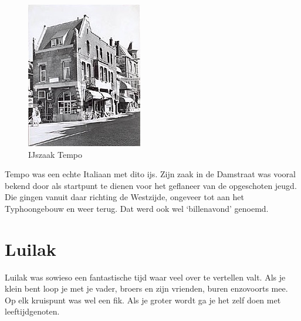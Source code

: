 \documentclass[12pt,twoside, openright]{memoir}
\begin{document}
\begin{figure}
\includegraphics[width=\textwidth]{img/ch8/Tempo}
\caption*{\footnotesize IJszaak Tempo}
\end{figure}

Tempo was een echte Italiaan met dito ijs. Zijn zaak in de Damstraat was vooral bekend door als startpunt te dienen voor het geflaneer van de opgeschoten jeugd.  Die gingen vanuit daar richting de Westzijde, ongeveer tot aan het Typhoongebouw en weer terug. Dat werd ook wel ‘billenavond’ genoemd. 

\chapter{Luilak} %
\label{cha:luilak}

Luilak was sowieso een fantastische tijd waar veel over te vertellen valt. Als je klein bent loop je met je vader, broers en zijn vrienden, buren enzovoorts mee. Op elk kruispunt was wel een fik. Als je groter wordt ga je het zelf doen met leeftijdgenoten. 
\end{document}
